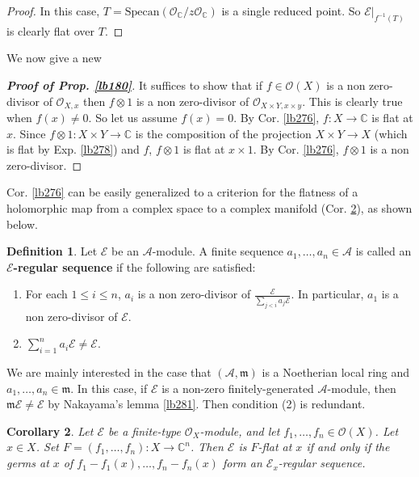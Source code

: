 \documentclass[12pt,b5paper,notitlepage]{report}
\theoremstyle{definition}
\newtheorem{df}{Definition}[section]
\theoremstyle{plain}
\newtheorem{co}[df]{Corollary}
\newcommand{\mc}{\mathcal}
\newcommand{\scr}{\mathscr}
\newcommand{\Cbb}{\mathbb C}
\newcommand{\Specan}{\mathrm{Specan}}
\newcommand{\mk}{\mathfrak m}
\numberwithin{equation}{section}
\begin{document}
\begin{proof}
In this case, $T=\Specan(\scr O_\Cbb/z\scr O_\Cbb)$ is a single reduced point. So $\scr E|_{f^{-1}(T)}$ is clearly flat over $T$.
\end{proof}


We now give a new

\begin{proof}[\textbf{Proof of Prop. \ref{lb180}}]
It suffices to show that if $f\in\scr O(X)$ is a non zero-divisor of $\scr O_{X,x}$ then $f\otimes 1$ is a non zero-divisor of $\scr O_{X\times Y,x\times y}$. This is clearly true when $f(x)\neq 0$. So let us assume $f(x)=0$. By Cor. \ref{lb276}, $f:X\rightarrow\Cbb$ is flat at $x$. Since $f\otimes 1:X\times Y\rightarrow\Cbb$ is the composition of the projection $X\times Y\rightarrow X$ (which is flat by Exp. \ref{lb278}) and $f$, $f\otimes 1$ is flat at $x\times 1$. By Cor. \ref{lb276}, $f\otimes 1$ is a non zero-divisor.
\end{proof}


Cor. \ref{lb276} can be easily generalized to a criterion for the flatness of a holomorphic map from a complex space to a complex manifold (Cor. \ref{lb279}), as shown below.


\begin{df}
Let $\mc E$ be an $\mc A$-module. A finite sequence $a_1,\dots,a_n\in\mc A$ is called an \textbf{$\mc E$-regular sequence}  if the following are satisfied:
\begin{enumerate}[label=(\arabic*)]
\item For each $1\leq i\leq n$, $a_i$ is a non zero-divisor of $\displaystyle\frac{\mc E}{\sum_{j<i}a_j\mc E}$. In particular, $a_1$ is a non zero-divisor of $\mc E$.
\item $\sum_{i=1}^n a_i\mc E\neq \mc E$.
\end{enumerate}
\end{df}


We are mainly interested in the case that $(\mc A,\mk)$ is a Noetherian local ring and $a_1,\dots,a_n\in\mk$. In this case, if $\mc E$ is a non-zero finitely-generated $\mc A$-module, then $\mk\mc E\neq\mc E$ by Nakayama's lemma \ref{lb281}. Then condition (2) is redundant.


\begin{co}\label{lb279}
Let $\scr E$ be a finite-type $\scr O_X$-module, and let $f_1,\dots,f_n\in\scr O(X)$. Let $x\in X$. Set $F=(f_1,\dots,f_n):X\rightarrow\Cbb^n$. Then $\scr E$ is $F$-flat at $x$ if and only if the germs at $x$ of $f_1-f_1(x),\dots,f_n-f_n(x)$ form an $\scr E_x$-regular sequence.
\end{co}
\end{document}
